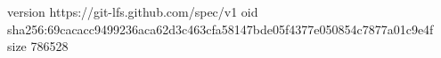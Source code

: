 version https://git-lfs.github.com/spec/v1
oid sha256:69cacacc9499236aca62d3c463cfa58147bde05f4377e050854c7877a01c9e4f
size 786528
